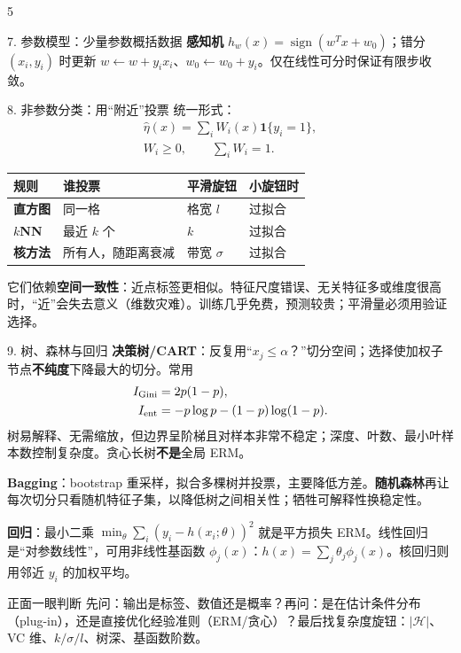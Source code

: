\documentclass[a4paper,landscape,fontset=fandol]{ctexart}
\newcommand{\term}[1]{\textbf{\color{teal!80!black}#1}}
\newcommand{\warn}[1]{\textbf{\color{red}#1}}
\newcommand{\ind}{\mathbf{1}}
\begin{document}
\begin{multicols*}{5}
\begin{boxx}{7. 参数模型：少量参数概括数据}
\term{感知机} $h_w(x)=\operatorname{sign}(w^Tx+w_0)$；错分 $(x_i,y_i)$ 时更新 $w\leftarrow w+y_ix_i$、$w_0\leftarrow w_0+y_i$。仅在线性可分时保证有限步收敛。
\end{boxx}

\begin{boxx}{8. 非参数分类：用“附近”投票}
统一形式：
\[
\begin{gathered}
\hat\eta(x)=\sum_i W_i(x)\ind\{y_i=1\},\\
W_i\ge0,\qquad \sum_iW_i=1.
\end{gathered}
\]
\begin{tabularx}{\linewidth}{@{}>{\bfseries}lXXX@{}}
\toprule
规则 & 谁投票 & 平滑旋钮 & 小旋钮时\\\midrule
直方图 & 同一格 & 格宽 $l$ & 过拟合\\
$k$NN & 最近 $k$ 个 & $k$ & 过拟合\\
核方法 & 所有人，随距离衰减 & 带宽 $\sigma$ & 过拟合\\\bottomrule
\end{tabularx}
它们依赖\term{空间一致性}：近点标签更相似。特征尺度错误、无关特征多或维度很高时，“近”会失去意义（维数灾难）。训练几乎免费，预测较贵；平滑量必须用验证选择。
\end{boxx}

\columnbreak

\begin{boxx}{9. 树、森林与回归}
\term{决策树/CART}：反复用“$x_j\le\alpha$？”切分空间；选择使加权子节点\term{不纯度}下降最大的切分。常用
\[
\begin{aligned}
I_{\rm Gini}&=2p(1-p),\\
I_{\rm ent}&=-p\log p-(1-p)\log(1-p).
\end{aligned}
\]
树易解释、无需缩放，但边界呈阶梯且对样本非常不稳定；深度、叶数、最小叶样本数控制复杂度。贪心长树\warn{不是}全局 ERM。

\term{Bagging}：bootstrap 重采样，拟合多棵树并投票，主要降低方差。\term{随机森林}再让每次切分只看随机特征子集，以降低树之间相关性；牺牲可解释性换稳定性。

\term{回归}：最小二乘 $\min_\theta\sum_i(y_i-h(x_i;\theta))^2$ 就是平方损失 ERM。线性回归是“对参数线性”，可用非线性基函数 $\phi_j(x)$：$h(x)=\sum_j\theta_j\phi_j(x)$。核回归则用邻近 $y_i$ 的加权平均。
\end{boxx}

\begin{keybox}{正面一眼判断}
先问：输出是标签、数值还是概率？再问：是在估计条件分布（plug-in），还是直接优化经验准则（ERM/贪心）？最后找复杂度旋钮：$|\mathcal H|$、VC 维、$k/\sigma/l$、树深、基函数阶数。
\end{keybox}

\end{multicols*}
\newpage
\fontsize{6.70}{7.50}\selectfont
\end{document}
